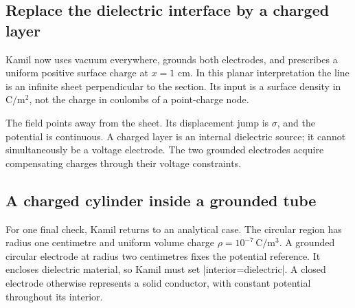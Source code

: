 \subsection{Replace the dielectric interface by a charged layer}
Kamil now uses vacuum everywhere, grounds both electrodes, and prescribes a
uniform positive surface charge at $x=1$ cm. In this planar interpretation the
line is an infinite sheet perpendicular to the section. Its input is a surface
density in $\mathrm{C/m^2}$, not the charge in coulombs of a point-charge node.

\begin{codeexample}[width=0pt]
\end{codeexample}

\begin{codeexample}[width=0pt]
\begin{tikzpicture}
\begin{axis}[width=9cm,height=5cm,no markers,grid=major,
  xlabel={$x$ (cm)},ylabel={$E_x$ (V/m)}]
  \femmelectricplot[profile=fe sheet radius,component=Ex,abscissa=x,
    plot options={blue!70!black,thick}]
\end{axis}
\end{tikzpicture}
\end{codeexample}

The field points away from the sheet. Its displacement jump is $\sigma$,
and the potential is continuous. A charged layer is an internal dielectric
source; it cannot simultaneously be a voltage electrode. The two grounded
electrodes acquire compensating charges through their voltage constraints.

\subsection{A charged cylinder inside a grounded tube}
For one final check, Kamil returns to an analytical case. The circular region
has radius one centimetre and uniform volume charge
$\rho=10^{-7}\,\mathrm{C/m^3}$. A grounded circular electrode at radius two
centimetres fixes the potential reference. It encloses dielectric material,
so Kamil must set |interior=dielectric|. A closed electrode otherwise represents
a solid conductor, with constant potential throughout its interior.


